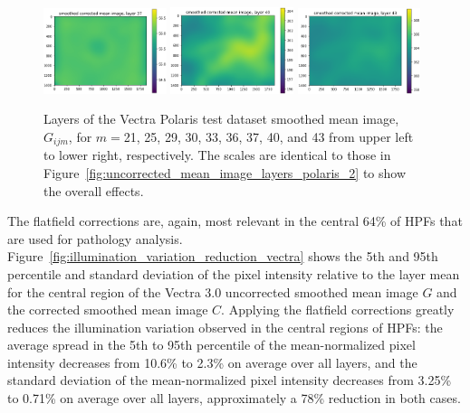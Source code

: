 \documentclass[letterpaper,11pt]{article}
\newcommand{\reffig}[1]{Figure~\ref{#1}}
\begin{document}
\begin{figure}[!ht]
\includegraphics[width=0.32\textwidth]{images/results/smoothed_corrected_mean_image_layers_polaris/smoothed_corrected_mean_image_layer_37_same_scale}
\includegraphics[width=0.32\textwidth]{images/results/smoothed_corrected_mean_image_layers_polaris/smoothed_corrected_mean_image_layer_40_same_scale}
\includegraphics[width=0.32\textwidth]{images/results/smoothed_corrected_mean_image_layers_polaris/smoothed_corrected_mean_image_layer_43_same_scale}
\caption{\footnotesize Layers of the Vectra Polaris test dataset smoothed mean image, $G_{ijm}$, for $m=$21, 25, 29, 30, 33, 36, 37, 40, and 43 from upper left to lower right, respectively. The scales are identical to those in \reffig{fig:uncorrected_mean_image_layers_polaris_2} to show the overall effects.}
\label{fig:corrected_smoothed_mean_image_layers_same_scale_polaris_2}
\end{figure}

The flatfield corrections are, again, most relevant in the central 64\% of HPFs that are used for pathology analysis. \reffig{fig:illumination_variation_reduction_vectra} shows the 5th and 95th percentile and standard deviation of the pixel intensity relative to the layer mean for the central region of the Vectra 3.0 uncorrected smoothed mean image $G$ and the corrected smoothed mean image $C$. Applying the flatfield corrections greatly reduces the illumination variation observed in the central regions of HPFs: the average spread in the 5th to 95th percentile of the mean-normalized pixel intensity decreases from 10.6\% to 2.3\% on average over all layers, and the standard deviation of the mean-normalized pixel intensity decreases from 3.25\% to 0.71\% on average over all layers, approximately a 78\% reduction in both cases.
\end{document}
